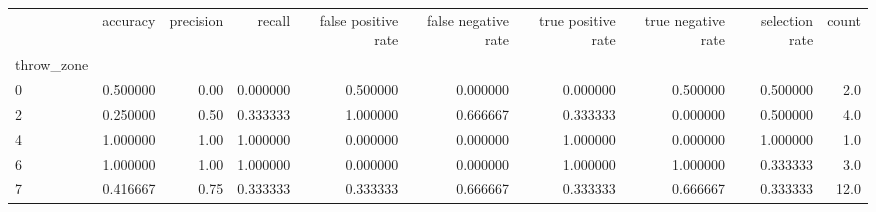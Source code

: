 \begin{tabular}{lrrrrrrrrr}
\toprule
{} &  accuracy &  precision &    recall &  false positive rate &  false negative rate &  true positive rate &  true negative rate &  selection rate &  count \\
throw\_zone &           &            &           &                      &                      &                     &                     &                 &        \\
\midrule
0          &  0.500000 &       0.00 &  0.000000 &             0.500000 &             0.000000 &            0.000000 &            0.500000 &        0.500000 &    2.0 \\
2          &  0.250000 &       0.50 &  0.333333 &             1.000000 &             0.666667 &            0.333333 &            0.000000 &        0.500000 &    4.0 \\
4          &  1.000000 &       1.00 &  1.000000 &             0.000000 &             0.000000 &            1.000000 &            0.000000 &        1.000000 &    1.0 \\
6          &  1.000000 &       1.00 &  1.000000 &             0.000000 &             0.000000 &            1.000000 &            1.000000 &        0.333333 &    3.0 \\
7          &  0.416667 &       0.75 &  0.333333 &             0.333333 &             0.666667 &            0.333333 &            0.666667 &        0.333333 &   12.0 \\
\bottomrule
\end{tabular}
